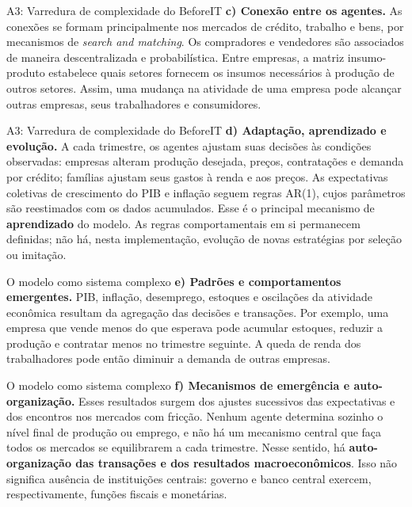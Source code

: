 \documentclass[aspectratio=169,11pt]{beamer}
\begin{document}
\begin{frame}[allowframebreaks]{A3: Varredura de complexidade do BeforeIT}
\normalsize
\textbf{c) Conexão entre os agentes.} As conexões se formam principalmente nos mercados de crédito, trabalho e bens, por mecanismos de \emph{search and matching}. Os compradores e vendedores são associados de maneira descentralizada e probabilística. Entre empresas, a matriz insumo-produto estabelece quais setores fornecem os insumos necessários à produção de outros setores. Assim, uma mudança na atividade de uma empresa pode alcançar outras empresas, seus trabalhadores e consumidores.
\end{frame}


\begin{frame}[allowframebreaks]{A3: Varredura de complexidade do BeforeIT}
\normalsize
\textbf{d) Adaptação, aprendizado e evolução.} A cada trimestre, os agentes ajustam suas decisões às condições observadas: empresas alteram produção desejada, preços, contratações e demanda por crédito; famílias ajustam seus gastos à renda e aos preços. As expectativas coletivas de crescimento do PIB e inflação seguem regras AR(1), cujos parâmetros são reestimados com os dados acumulados. Esse é o principal mecanismo de \textbf{aprendizado} do modelo. As regras comportamentais em si permanecem definidas; não há, nesta implementação, evolução de novas estratégias por seleção ou imitação.
\end{frame}


\begin{frame}[allowframebreaks]{O modelo como sistema complexo}
\normalsize
\textbf{e) Padrões e comportamentos emergentes.} PIB, inflação, desemprego, estoques e oscilações da atividade econômica resultam da agregação das decisões e transações. Por exemplo, uma empresa que vende menos do que esperava pode acumular estoques, reduzir a produção e contratar menos no trimestre seguinte. A queda de renda dos trabalhadores pode então diminuir a demanda de outras empresas.
\end{frame}


\begin{frame}[allowframebreaks]{O modelo como sistema complexo}
\normalsize
\textbf{f) Mecanismos de emergência e auto-organização.} Esses resultados surgem dos ajustes sucessivos das expectativas e dos encontros nos mercados com fricção. Nenhum agente determina sozinho o nível final de produção ou emprego, e não há um mecanismo central que faça todos os mercados se equilibrarem a cada trimestre. Nesse sentido, há \textbf{auto-organização das transações e dos resultados macroeconômicos}. Isso não significa ausência de instituições centrais: governo e banco central exercem, respectivamente, funções fiscais e monetárias.
\end{frame}
\end{document}
